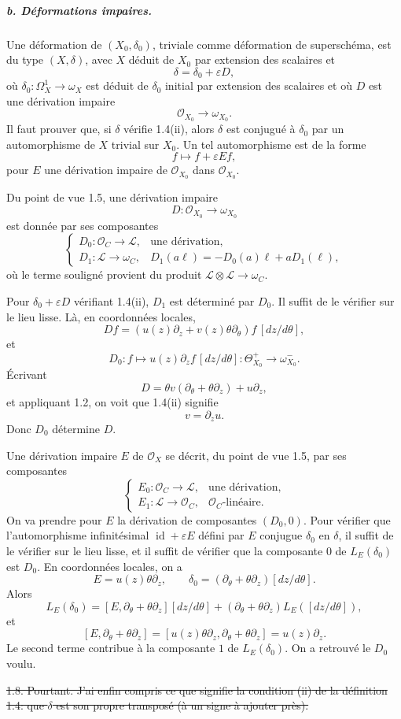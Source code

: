 \documentclass[11pt]{article}
\newcommand{\cO}{\mathcal O}
\newcommand{\cL}{\mathcal L}
\begin{document}
\subparagraph{b. Déformations impaires.}
Une déformation de $(X_0,\delta_0)$, triviale comme déformation de superschéma, est du type $(X,\delta)$, avec $X$ déduit de $X_0$ par extension des scalaires et
\[
  \delta=\delta_0+\varepsilon D,
\]
où $\delta_0:\Omega^1_X\to\omega_X$ est déduit de $\delta_0$ initial par extension des scalaires et où $D$ est une dérivation impaire
\[
  \cO_{X_0}\longrightarrow\omega_{X_0}.
\]
Il faut prouver que, si $\delta$ vérifie 1.4(ii), alors $\delta$ est conjugué à $\delta_0$ par un automorphisme de $X$ trivial sur $X_0$. Un tel automorphisme est de la forme
\[
  f\longmapsto f+\varepsilon E f,
\]
pour $E$ une dérivation impaire de $\cO_{X_0}$ dans $\cO_{X_0}$.

Du point de vue 1.5, une dérivation impaire
\[
  D:\cO_{X_0}\longrightarrow\omega_{X_0}
\]
est donnée par ses composantes
\[
\begin{cases}
D_0:\cO_C\longrightarrow\cL, & \text{une dérivation},\\
D_1:\cL\longrightarrow\omega_C, & D_1(a\ell)=-D_0(a)\ell+aD_1(\ell),
\end{cases}
\]
où le terme souligné provient du produit $\cL\otimes\cL\to\omega_C$.

Pour $\delta_0+\varepsilon D$ vérifiant 1.4(ii), $D_1$ est déterminé par $D_0$. Il suffit de le vérifier sur le lieu lisse. Là, en coordonnées locales,
\[
  Df=(u(z)\partial_z+v(z)\theta\partial_\theta)f\,[dz/d\theta],
\]
et
\[
  D_0:f\longmapsto u(z)\partial_z f\,[dz/d\theta]:\Theta_{X_0}^+\to\omega_{X_0}^-.
\]
Écrivant
\[
  D=\theta v(\partial_\theta+\theta\partial_z)+u\partial_z,
\]
et appliquant 1.2, on voit que 1.4(ii) signifie
\[
  v=\partial_z u.
\]
Donc $D_0$ détermine $D$.

Une dérivation impaire $E$ de $\cO_X$ se décrit, du point de vue 1.5, par ses composantes
\[
\begin{cases}
E_0:\cO_C\longrightarrow\cL, & \text{une dérivation},\\
E_1:\cL\longrightarrow\cO_C, & \text{$\cO_C$-linéaire}.
\end{cases}
\]
On va prendre pour $E$ la dérivation de composantes $(D_0,0)$. Pour vérifier que l'automorphisme infinitésimal $\operatorname{id}+\varepsilon E$ défini par $E$ conjugue $\delta_0$ en $\delta$, il suffit de le vérifier sur le lieu lisse, et il suffit de vérifier que la composante $0$ de $L_E(\delta_0)$ est $D_0$. En coordonnées locales, on a
\[
  E=u(z)\theta\partial_z,
  \qquad
  \delta_0=(\partial_\theta+\theta\partial_z)[dz/d\theta].
\]
Alors
\[
  L_E(\delta_0)= [E,\partial_\theta+\theta\partial_z][dz/d\theta]
    +(\partial_\theta+\theta\partial_z)L_E([dz/d\theta]),
\]
et
\[
  [E,\partial_\theta+\theta\partial_z]
   =[u(z)\theta\partial_z,\partial_\theta+\theta\partial_z]
   =u(z)\partial_z.
\]
Le second terme contribue à la composante $1$ de $L_E(\delta_0)$. On a retrouvé le $D_0$ voulu.


\sout{1.8. Pourtant. J'ai enfin compris ce que signifie la condition \textup{(ii)} de la définition \textup{1.4}: que $\delta$ est son propre transposé (à un signe à ajouter près).}
\end{document}
